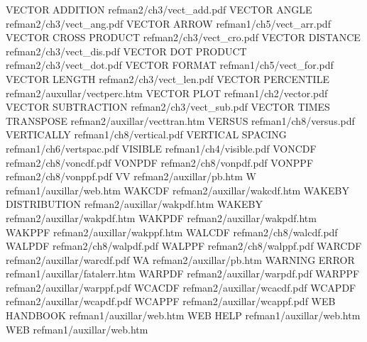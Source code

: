 VECTOR ADDITION                         refman2/ch3/vect_add.pdf
VECTOR ANGLE                            refman2/ch3/vect_ang.pdf
VECTOR ARROW                            refman1/ch5/vect_arr.pdf
VECTOR CROSS PRODUCT                    refman2/ch3/vect_cro.pdf
VECTOR DISTANCE                         refman2/ch3/vect_dis.pdf
VECTOR DOT PRODUCT                      refman2/ch3/vect_dot.pdf
VECTOR FORMAT                           refman1/ch5/vect_for.pdf
VECTOR LENGTH                           refman2/ch3/vect_len.pdf
VECTOR PERCENTILE                       refman2/auxullar/vectperc.htm
VECTOR PLOT                             refman1/ch2/vector.pdf
VECTOR SUBTRACTION                      refman2/ch3/vect_sub.pdf
VECTOR TIMES TRANSPOSE                  refman2/auxillar/vecttran.htm
VERSUS                                  refman1/ch8/versus.pdf
VERTICALLY                              refman1/ch8/vertical.pdf
VERTICAL SPACING                        refman1/ch6/vertspac.pdf
VISIBLE                                 refman1/ch4/visible.pdf
VONCDF                                  refman2/ch8/voncdf.pdf
VONPDF                                  refman2/ch8/vonpdf.pdf
VONPPF                                  refman2/ch8/vonppf.pdf
VV                                      refman2/auxillar/pb.htm
W                                       refman1/auxillar/web.htm
WAKCDF                                  refman2/auxillar/wakcdf.htm
WAKEBY DISTRIBUTION                     refman2/auxillar/wakpdf.htm
WAKEBY                                  refman2/auxillar/wakpdf.htm
WAKPDF                                  refman2/auxillar/wakpdf.htm
WAKPPF                                  refman2/auxillar/wakppf.htm
WALCDF                                  refman2/ch8/walcdf.pdf
WALPDF                                  refman2/ch8/walpdf.pdf
WALPPF                                  refman2/ch8/walppf.pdf
WARCDF                                  refman2/auxillar/warcdf.pdf
WA                                      refman2/auxillar/pb.htm
WARNING ERROR                           refman1/auxillar/fatalerr.htm
WARPDF                                  refman2/auxillar/warpdf.pdf
WARPPF                                  refman2/auxillar/warppf.pdf
WCACDF                                  refman2/auxillar/wcacdf.pdf
WCAPDF                                  refman2/auxillar/wcapdf.pdf
WCAPPF                                  refman2/auxillar/wcappf.pdf
WEB HANDBOOK                            refman1/auxillar/web.htm
WEB HELP                                refman1/auxillar/web.htm
WEB                                     refman1/auxillar/web.htm
